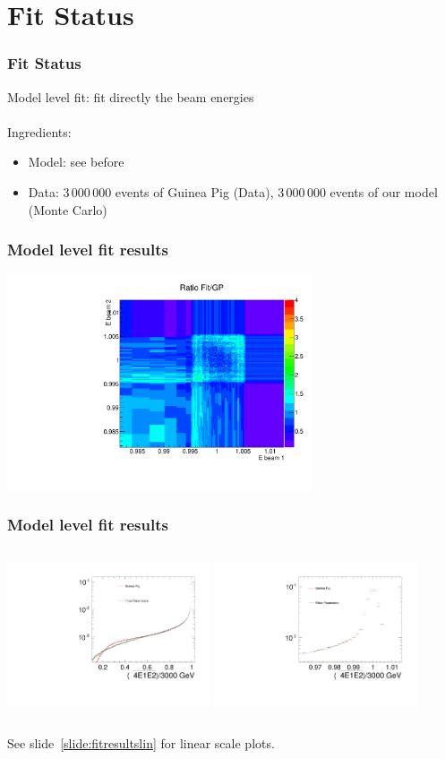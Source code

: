 \documentclass{beamer}
\begin{document}
\section{Fit Status}
\begin{frame}
\frametitle{Fit Status}
Model level fit: fit directly the beam energies\\
~\\
Ingredients:
\begin{itemize}
  \item Model: see before
  \item Data: 3\,000\,000 events of Guinea Pig (Data), 3\,000\,000 events of our
  model (Monte Carlo)
\end{itemize}
\end{frame}
\begin{frame}
\frametitle{Model level fit results}
\begin{center}
\includegraphics[width=9cm]{Ratio_Fit_vs_GP_FCAL.pdf}
\end{center}
\end{frame}
\begin{frame}
\frametitle{Model level fit results}
\begin{columns}[c]
\column{6cm}
\includegraphics[width=6cm]{FullSpectrumFCAL.pdf}
\column{6cm}	
\includegraphics[width=6cm]{FullSpectrumFCAL_zoom.pdf}
\end{columns}
\footnotesize{See slide~\ref{slide:fitresultslin} for linear scale plots.}
\end{frame}
\end{document}
